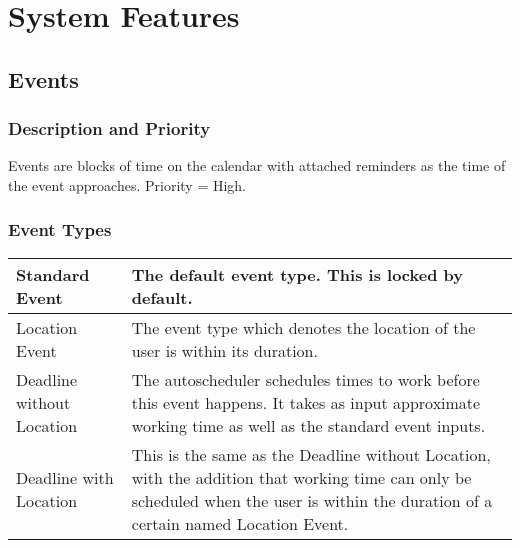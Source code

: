 \documentclass{scrreprt}
\begin{document}
\chapter{System Features}

\section{Events}

\subsection{Description and Priority}
Events are blocks of time on the calendar with attached reminders as the time of the event approaches. Priority = High.

\subsection{Event Types}
\begin{center}
\begin{tabular}{ | p{5cm} | p{10cm} | }
\hline
Standard Event &
The default event type. This is locked by default.\\
\hline
Location Event &
The event type which denotes the location of the user is within its duration.\\
\hline
Deadline without Location &
The autoscheduler schedules times to work before this event happens. It takes as input
approximate working time as well as the standard event inputs.\\
\hline
Deadline with Location &
This is the same as the Deadline without Location, with the addition
that working time can only be scheduled when the user is within the duration of a certain named Location Event.\\
\hline
\end{tabular}
\end{center}
\end{document}
